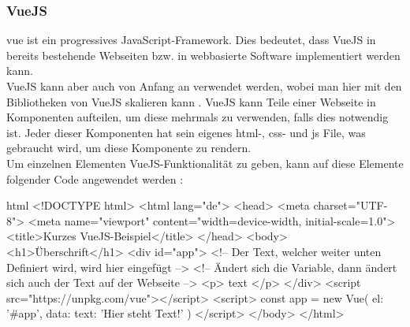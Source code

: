 \subsubsection{VueJS}
\gls{vue} ist ein progressives JavaScript-Framework. Dies bedeutet, dass VueJS in bereits bestehende Webseiten bzw. in webbasierte Software implementiert werden kann.\\
VueJS kann aber auch von Anfang an verwendet werden, wobei man hier mit den Bibliotheken von VueJS skalieren kann \cite{vuedoc}. VueJS kann Teile einer Webseite in Komponenten aufteilen, um diese mehrmals zu verwenden, falls dies notwendig ist. Jeder dieser Komponenten hat sein eigenes \Gls{html}-, \Gls{css}- und \Gls{js} File, was gebraucht wird, um diese Komponente zu rendern.\\
Um einzelnen Elementen VueJS-Funktionalität zu geben, kann auf diese Elemente folgender Code angewendet werden \cite{vuedoc}:
\begin{code}{html}
	<!DOCTYPE html>
	<html lang="de">
		<head>
			<meta charset="UTF-8">
			<meta name="viewport" content="width=device-width, initial-scale=1.0">
			<title>Kurzes VueJS-Beispiel</title>
		</head>
		<body>
			<h1>Überschrift</h1>
			<div id="app">
				<!-- Der Text, welcher weiter unten Definiert wird, wird hier eingefügt -->
				<!-- Ändert sich die Variable, dann ändert sich auch der Text auf der Webseite -->
				<p> {{ text }} </p>
			</div>
			<script src="https://unpkg.com/vue"></script>
			<script>
				const app = new Vue({
					el: '#app',
					data: {
						text: 'Hier steht Text!'
					}
				})
			</script>
		</body>
	</html>
\end{code}
